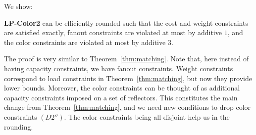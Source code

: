 We show:

\begin{lemma}
\label{lem:color}
\textbf{LP-Color2} can be efficiently rounded such that the cost and weight constraints are satisfied exactly, fanout constraints are violated at most by additive $1$, and the color constraints are violated at most by additive $3$.
\end{lemma}

The proof is very similar to Theorem~\ref{thm:matching}. Note that, here instead of having capacity constraints, we have fanout constraints. Weight constraints correspond to load constraints in Theorem~\ref{thm:matching}, but now they provide lower bounds. Moreover, the color constraints can be thought of as additional capacity constraints imposed on a set of reflectors. This constitutes the main change from Theorem~\ref{thm:matching}, and we need new conditions to drop color constraints $(D2'')$. The color constraints being all disjoint help us in the rounding.

